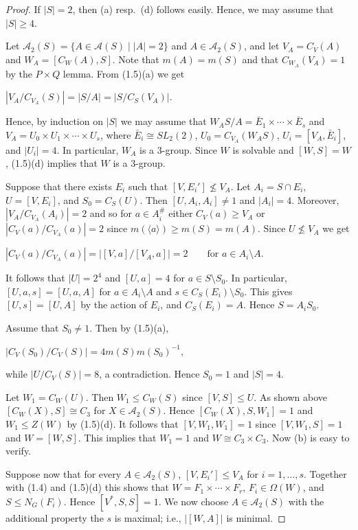 \documentclass[11pt]{article}
\theoremstyle{plain}
\theoremstyle{stmplain}
\newcommand{\disp}[1]{\begin{center}$\displaystyle #1$\end{center}}
\begin{document}
\begin{proof}
If $|S| = 2$, then (a) resp.\ (d) follows easily. Hence, we may assume that
$|S| \ge 4$.

\smallskip
\noindent Let $\mathcal{A}_2(S) = \{A \in \mathcal{A}(S) \mid |A| = 2\}$ and $A \in
\mathcal{A}_2(S)$, and let $V_A = C_V(A)$ and $W_A = [C_W(A), S]$. Note that
$m(A) = m(S)$ and that $C_{W_A}(V_A) = 1$ by the $P \times Q$ lemma. From
(1.5)(a) we get
\disp{|V_A/C_{V_A}(S)| = |S/A| = |S/C_S(V_A)|.}
Hence, by induction on $|S|$ we may assume that $W_AS/A = \bar{E}_1 \times
\cdots \times \bar{E}_s$ and $V_A = U_0 \times U_1 \times \cdots \times U_s$,
where $\bar{E}_i \cong SL_2(2)$, $U_0 = C_{V_A}(W_AS)$, $U_i = [V_A, \bar{E}_i]$,
and $|U_i| = 4$. In particular, $W_A$ is a 3-group. Since $W$ is solvable and
$[W, S] = W$, (1.5)(d) implies that $W$ is a 3-group.

\noindent Suppose that there exists $E_i$ such that $[V, E_i'] \nleq V_A$. Let
$A_i = S \cap E_i$, $U = [V, E_i]$, and $S_0 = C_S(U)$. Then $[U, A_i, A_i] \ne
1$ and $|A_i| = 4$. Moreover, $|V_A/C_{V_A}(A_i)| = 2$ and so for $a \in A_i^{\#}$
either $C_V(a) \ge V_A$ or $|C_V(a)/C_{V_A}(a)| = 2$ since $m(\langle a \rangle)
\ge m(S) = m(A)$. Since $U \nleq V_A$ we get
\disp{|C_V(a)/C_{V_A}(a)| = |[V, a]/[V_A, a]| = 2 \qquad \text{for } a \in A_i \setminus A.}
It follows that $|U| = 2^4$ and $[U, a] = 4$ for $a \in S \setminus S_0$. In
particular, $[U, a, s] = [U, a, A]$ for $a \in A_i \setminus A$ and $s \in
C_S(E_i) \setminus S_0$. This gives $[U, s] = [U, A]$ by the action of $E_i$,
and $C_S(E_i) = A$. Hence $S = A_iS_0$.

\smallskip
\noindent Assume that $S_0 \ne 1$. Then by (1.5)(a),
\disp{|C_V(S_0)/C_V(S)| = 4m(S)m(S_0)^{-1},}
while $|U/C_V(S)| = 8$, a contradiction. Hence $S_0 = 1$ and $|S| = 4$.

\smallskip
\noindent Let $W_1 = C_W(U)$. Then $W_1 \le C_W(S)$ since $[V, S] \le U$. As shown
above $[C_W(X), S] \cong C_3$ for $X \in \mathcal{A}_2(S)$. Hence $[C_W(X), S,
W_1] = 1$ and $W_1 \le Z(W)$ by (1.5)(d). It follows that $[V, W_1, W_1] = 1$
since $[V, W_1, S] = 1$ and $W = [W, S]$. This implies that $W_1 = 1$ and $W
\cong C_3 \times C_3$. Now (b) is easy to verify.

\smallskip
\noindent Suppose now that for every $A \in \mathcal{A}_2(S)$, $[V, E_i'] \le V_A$
for $i = 1, \ldots, s$. Together with (1.4) and (1.5)(d) this shows that $W =
F_1 \times \cdots \times F_r$, $F_i \in \Omega(W)$, and $S \le N_G(F_i)$. Hence
$[V^*, S, S] = 1$. We now choose $A \in \mathcal{A}_2(S)$ with the additional
property the $s$ is maximal; i.e., $|[W, A]|$ is minimal.


\end{proof}
\end{document}
